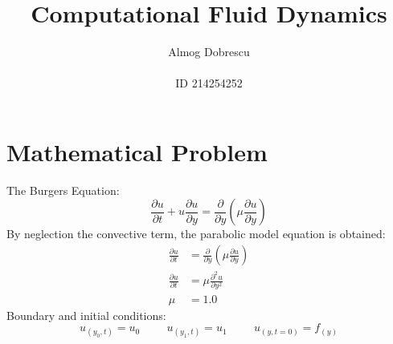 \documentclass[11pt, a4paper]{article}
\title{Computational Fluid Dynamics}
\author{Almog Dobrescu\\\\ID 214254252}
\begin{document}
\maketitle

\thispagestyle{empty}
\newpage
\setcounter{page}{1}

\tableofcontents
\vfil
\listoffigures
\newpage

\section{Mathematical Problem}
The Burgers Equation:
\begin{equation}
    \frac{\partial u}{\partial t} + u\frac{\partial u}{\partial y} = \frac{\partial}{\partial y}\left(\mu\frac{\partial u}{\partial y}\right)
\end{equation}
By neglection the convective term, the parabolic model equation is obtained:
\begin{align}
    \frac{\partial u}{\partial t} &= \frac{\partial}{\partial y}\left(\mu\frac{\partial u}{\partial y}\right)\\
    \frac{\partial u}{\partial t} &= \mu\frac{\partial^2 u}{\partial y^2}\\
    \mu &= 1.0
\end{align}
Boundary and initial conditions:
\begin{equation}
    u_{(y_0, t)} = u_0 \hspace{1cm} u_{(y_1, t)} = u_1 \hspace{1cm} u_{(y, t=0)} = f_{(y)}
\end{equation}
\end{document}
